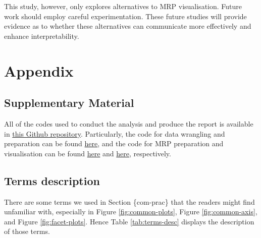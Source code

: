 \documentclass{monashthesis}
\begin{document}
This study, however, only explores alternatives to MRP visualisation. Future work should employ careful experimentation. These future studies will provide evidence as to whether these alternatives can communicate more effectively and enhance interpretability.

\appendix

\hypertarget{appendix}{%
\chapter{Appendix}\label{appendix}}

\hypertarget{supplementary-material}{%
\section{Supplementary Material}\label{supplementary-material}}

All of the codes used to conduct the analysis and produce the report is available in \href{https://github.com/Dewi-Amaliah/MRP_diagnostic_plot}{this Github repository}. Particularly, the code for data wrangling and preparation can be found \href{https://github.com/Dewi-Amaliah/MRP_diagnostic_plot/blob/main/case_study/analysis/cces_acs_wrangling.Rmd}{here}, and the code for MRP preparation and visualisation can be found \href{https://github.com/Dewi-Amaliah/MRP_diagnostic_plot/blob/main/case_study/analysis/mrp_fitting.R}{here} and \href{https://github.com/Dewi-Amaliah/MRP_diagnostic_plot/blob/main/case_study/analysis/mrp_vis.R}{here}, respectively.

\hypertarget{terms}{%
\section{Terms description}\label{terms}}

There are some terms we used in Section \{com-prac\} that the readers might find unfamiliar with, especially in Figure \ref{fig:common-plots}, Figure \ref{fig:common-axis}, and Figure \ref{fig:facet-plots}. Hence Table \ref{tab:terms-desc} displays the description of those terms.
\end{document}
